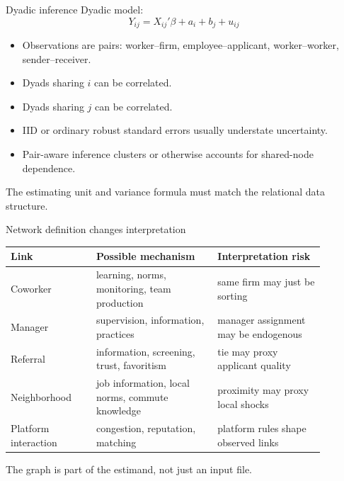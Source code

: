 \documentclass[aspectratio=169,11pt]{beamer}
\newcommand{\1}{\mathbf{1}}
\begin{document}
\begin{frame}{Dyadic inference}
\small
Dyadic model:
\[
Y_{ij}=X_{ij}'\beta+a_i+b_j+u_{ij}
\]

\begin{itemize}
    \item Observations are pairs: worker--firm, employee--applicant, worker--worker, sender--receiver.
    \item Dyads sharing \(i\) can be correlated.
    \item Dyads sharing \(j\) can be correlated.
    \item IID or ordinary robust standard errors usually understate uncertainty.
    \item Pair-aware inference clusters or otherwise accounts for shared-node dependence.
\end{itemize}

\medskip
The estimating unit and variance formula must match the relational data structure.
\end{frame}

\begin{frame}{Network definition changes interpretation}
\small
\begin{tabular}{p{0.24\linewidth} p{0.34\linewidth} p{0.30\linewidth}}
\toprule
Link & Possible mechanism & Interpretation risk \\
\midrule
Coworker & learning, norms, monitoring, team production & same firm may just be sorting \\
Manager & supervision, information, practices & manager assignment may be endogenous \\
Referral & information, screening, trust, favoritism & tie may proxy applicant quality \\
Neighborhood & job information, local norms, commute knowledge & proximity may proxy local shocks \\
Platform interaction & congestion, reputation, matching & platform rules shape observed links \\
\bottomrule
\end{tabular}

\medskip
The graph is part of the estimand, not just an input file.
\end{frame}
\end{document}
